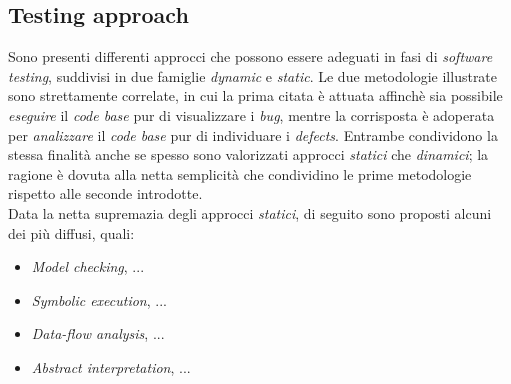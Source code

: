 \documentclass{article}
\begin{document}
\subsection*{Testing approach}
\large
Sono presenti differenti approcci che possono essere adeguati in fasi di \textit{software testing}, suddivisi in due famiglie \textit{dynamic} e \textit{static}. Le due metodologie illustrate sono strettamente correlate, in cui la prima citata è attuata affinchè sia possibile \textit{eseguire} il \textit{code base} pur di visualizzare i \textit{bug}, mentre la corrisposta è adoperata per \textit{analizzare} il \textit{code base} pur di individuare i \textit{defects}. Entrambe condividono la stessa finalità anche se spesso sono valorizzati approcci \textit{statici} che \textit{dinamici}; la ragione è dovuta alla netta semplicità che condividino le prime metodologie rispetto alle seconde introdotte.\vspace*{14pt}\\
Data la netta supremazia degli approcci \textit{statici}, di seguito sono proposti alcuni dei più diffusi, quali:
\begin{itemize}[label={-}]
    \itemsep0em
    \item \textit{Model checking}, ...
    \item \textit{Symbolic execution}, ...
    \item \textit{Data-flow analysis}, ...
    \item \textit{Abstract interpretation}, ...  
\end{itemize} 
\end{document}
